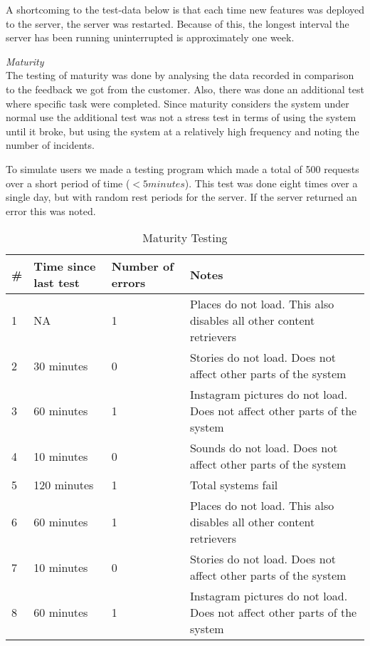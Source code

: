 A shortcoming to the test-data below is that each time new features was deployed to the server, the server was restarted. Because of this, the longest interval the server has been running uninterrupted is approximately one week. 

\emph{Maturity}\\
The testing of maturity was done by analysing the data recorded in comparison to the feedback we got from the customer. Also, there was done an additional  test where specific task were completed. Since maturity considers the system under normal use the additional test was not a stress test in terms of using the system until it broke, but using the system at a relatively high frequency and noting the number of incidents.

To simulate users we made a testing program which made a total of 500 requests over a short period of time ($<5 minutes$). This test was done eight times over a single day, but with random rest periods for the server.  If the server returned an error this was noted. 

\begin{table}[!htp]
\begin{center}
	\begin{tabular}{ | l | l | l | p{7cm} | }
	\hline
	\#	&Time since last test &Number of errors	& Notes \\ \hline
	1	&NA			& 1 & Places do not load. This also disables all other content retrievers\\ \hline
	2	&30 minutes		& 0 & Stories do not load. Does not affect other parts of the system\\ \hline
	3	&60 minutes		& 1 & Instagram pictures do not load. Does not affect other parts of the system\\ \hline
	4	&10 minutes		& 0 & Sounds do not load. Does not affect other parts of the system\\ \hline
	5	&120 minutes	& 1 & Total systems fail\\ \hline
	6	&60 minutes		& 1 & Places do not load. This also disables all other content retrievers\\ \hline
	7	&10 minutes		& 0 & Stories do not load. Does not affect other parts of the system\\ \hline
	8	&60 minutes		& 1 & Instagram pictures do not load. Does not affect other parts of the system\\
	 \hline
	 \end{tabular}
\end{center}
\caption{Maturity Testing}
\label{tab:Maturity Testing}
\end{table}

